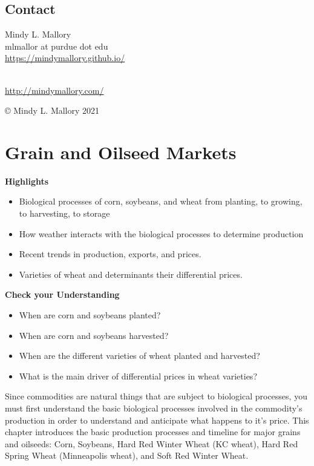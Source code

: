 \documentclass[
]{book}
\providecommand{\tightlist}{%
  \setlength{\itemsep}{0pt}\setlength{\parskip}{0pt}}
\begin{document}
\hypertarget{contact}{%
\section*{Contact}\label{contact}}

Mindy L. Mallory\\
mlmallor at purdue dot edu\\
\url{https://mindymallory.github.io/}\strut \\
\url{http://mindymallory.com/}

© Mindy L. Mallory 2021

\hypertarget{grain-and-oilseed-markets}{%
\chapter{Grain and Oilseed Markets}\label{grain-and-oilseed-markets}}

\textbf{Highlights}

\begin{itemize}
\tightlist
\item
  Biological processes of corn, soybeans, and wheat from planting, to growing, to harvesting, to storage
\item
  How weather interacts with the biological processes to determine production
\item
  Recent trends in production, exports, and prices.
\item
  Varieties of wheat and determinants their differential prices.
\end{itemize}

\textbf{Check your Understanding}

\begin{itemize}
\tightlist
\item
  When are corn and soybeans planted?
\item
  When are corn and soybeans harvested?
\item
  When are the different varieties of wheat planted and harvested?
\item
  What is the main driver of differential prices in wheat varieties?
\end{itemize}

Since commodities are natural things that are subject to biological processes, you must first understand the basic biological processes involved in the commodity's production in order to understand and anticipate what happens to it's price. This chapter introduces the basic production processes and timeline for major grains and oilseeds: Corn, Soybeans, Hard Red Winter Wheat (KC wheat), Hard Red Spring Wheat (Minneapolis wheat), and Soft Red Winter Wheat.
\end{document}

